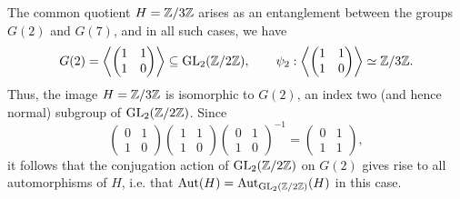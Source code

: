 The common quotient $H = \mathbb{Z}/3\mathbb{Z}$ arises as an entanglement between the groups $G(2)$ and $G(7)$, and in all such cases, we have
\begin{equation} \label{descriptionofpsisub2in14case}
G(2) = \left\langle \begin{pmatrix} 1 & 1 \\ 1 & 0 \end{pmatrix} \right\rangle \subseteq \operatorname{GL}_2(\mathbb{Z}/2\mathbb{Z}), \quad\quad \psi_2 :  \left\langle \begin{pmatrix} 1 & 1 \\ 1 & 0 \end{pmatrix} \right\rangle \simeq \mathbb{Z}/3\mathbb{Z}.
\end{equation}
Thus, the image $H = \mathbb{Z}/3\mathbb{Z}$ is isomorphic to $G(2)$, an index two (and hence normal) subgroup of $\operatorname{GL}_2(\mathbb{Z}/2\mathbb{Z})$.  Since
\[
\begin{pmatrix} 0 & 1 \\ 1 & 0 \end{pmatrix} \begin{pmatrix} 1 & 1 \\ 1 & 0 \end{pmatrix} \begin{pmatrix} 0 & 1 \\ 1 & 0 \end{pmatrix}^{-1} = \begin{pmatrix} 0 & 1 \\ 1 & 1 \end{pmatrix},
\]
it follows that the conjugation action of $\operatorname{GL}_2(\mathbb{Z}/2\mathbb{Z})$ on $G(2)$ gives rise to all automorphisms of $H$, i.e. that $\operatorname{Aut}(H) = \operatorname{Aut}_{\operatorname{GL}_2(\mathbb{Z}/2\mathbb{Z})}(H)$ in this case.

